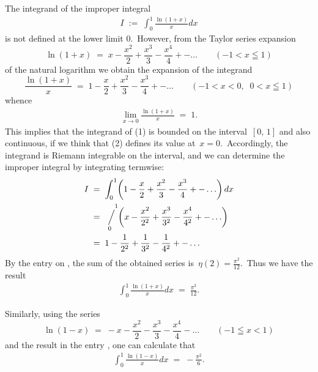 \documentclass[12pt]{article}
\newcommand{\sijoitus}[2]%
{\operatornamewithlimits{\Big/}_{\!\!\!#1}^{\,#2}}
\begin{document}

The integrand of the improper integral
\begin{align}
I \;:=\; \int_0^1\frac{\ln(1\!+\!x)}{x}dx
\end{align}
is not defined at the lower limit 0.\, However, from the Taylor series expansion 
$$\ln(1\!+\!x) \;=\; x-\frac{x^2}{2}+\frac{x^3}{3}-\frac{x^4}{4}+-\ldots \qquad (-1 < x \leqq 1)$$
of the natural logarithm we obtain the expansion of the integrand
$$
\frac{\ln(1\!+\!x)}{x} \;=\; 1-\frac{x}{2}+\frac{x^2}{3}-\frac{x^3}{4}+-\ldots \qquad (-1 < x < 0,\;\; 0 < x \leqq 1)
$$
whence
\begin{align}
\lim_{x\to0}\frac{\ln(1\!+\!x)}{x} \;=\; 1.
\end{align}
This implies that the integrand of (1) is bounded on the interval \,$[0,\,1]$ and also continuous, if we think that (2) defines its value at\, $x = 0$.\, Accordingly, the integrand is Riemann integrable on the interval, and we can determine the improper integral by integrating termwise:
\begin{align*}
I & \;=\; \int_0^1\!\left(1-\frac{x}{2}+\frac{x^2}{3}-\frac{x^3}{4}+-\ldots\right)dx\\
  & \;=\; \sijoitus{0}{\quad1}\!\left(x-\frac{x^2}{2^2}+\frac{x^3}{3^2}-\frac{x^4}{4^2}+-\ldots\right)\\
  & \;=\; 1-\frac{1}{2^2}+\frac{1}{3^2}-\frac{1}{4^2}+-\ldots
\end{align*}
By the entry on , the sum of the obtained series is\, $\eta(2) = \frac{\pi^2}{12}$.\, Thus we have the result
\begin{align}
\int_0^1\frac{\ln(1\!+\!x)}{x}dx \;=\; \frac{\pi^2}{12}.
\end{align}


Similarly, using the series
$$\ln(1\!-\!x) \;=\; -x-\frac{x^2}{2}-\frac{x^3}{3}-\frac{x^4}{4}-\ldots \qquad (-1 \leqq x < 1)$$
and the result in the entry , one can calculate that
\begin{align}
\int_0^1\frac{\ln(1\!-\!x)}{x}dx \;=\; -\frac{\pi^2}{6}.
\end{align}

\end{document}
